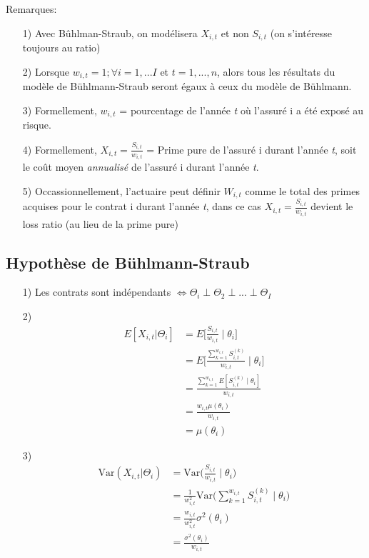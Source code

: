 Remarques:
\begin{itemize}
\item[1)] Avec Bûhlman-Straub, on modélisera $X_{i,t}$ et non $S_{i,t}$ (on s'intéresse toujours au ratio)
\item[2)] Lorsque $w_{i,t} =1 ; \forall i = 1,...I$ et $t = 1,...,n$, alors tous les résultats du modèle de Bühlmann-Straub seront égaux à ceux du modèle de Bühlmann.
\item[3)] Formellement, $w_{i,t}$ = pourcentage de l'année \textit{t} où l'assuré i a été exposé au risque.
\item[4)] Formellement, $X_{i,t} = \frac{S_{i,t}}{w_{i,t}}$ = Prime pure de l'assuré i durant l'année \textit{t}, soit le coût moyen \emph{annualisé} de l'assuré i durant l'année \textit{t}.
\item[5)] Occassionnellement, l'actuaire peut définir $W_{i,t}$ comme le total des primes acquises pour le contrat i durant l'année \textit{t}, dans ce cas $X_{i,t} = \frac{S_{i,t}}{w_{i,t}}$ devient le loss ratio (au lieu de la prime pure)
\end{itemize}

\subsection*{Hypothèse de Bühlmann-Straub}
\begin{itemize}
\item[1)] Les contrats sont indépendants $\Leftrightarrow \Theta_i \perp \Theta_2 \perp...\perp\Theta_I$
\item[2)] \begin{align*}
E[X_{i,t}|\Theta_i] &= E \Big[\frac{S_{i,t}}{w_{i,t}} \mid \theta_i \Big] \\
&= E \Big[\frac{\sum_{k=1}^{w_{i,t}} S_{i,t}^{(k)}}{w_{i,t}} \mid \theta_i \Big] \\
&= \frac{\sum_{k=1}^{w_{i,t}} E[ S_{i,t}^{(k)}\mid \theta_i]}{w_{i,t}} \\
&= \frac{w_{i,t} \mu(\theta_i) }{w_{i,t}} \\
&=\mu(\theta_i)
\end{align*}
\item[3)] \begin{align*}
\text{Var}( X_{i,t}|\Theta_i) &= \text{Var} \Big(\frac{S_{i,t}}{w_{i,t}} \mid \theta_i \Big) \\
&= \frac{1}{w_{i,t}^2} \text{Var} \Big(\sum_{k=1}^{w_{i,t}}S_{i,t}^{(k)}\mid \theta_i \Big)\\
&=\frac{w_{i,t}}{w_{i,t}^2} \sigma^2(\theta_i) \\
&= \frac{\sigma^2(\theta_i)}{w_{i,t}}\\
\end{align*}

\end{itemize}


